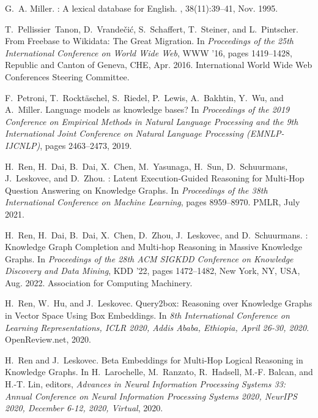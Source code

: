 \documentclass[11pt]{article}
\begin{document}
\begin{thebibliography}{10}
\begin{small}
G.~A. Miller.
: A lexical database for {{English}}.
, 38(11):39--41, Nov. 1995.

T.~Pellissier~Tanon, D.~Vrande{\v c}i{\'c}, S.~Schaffert, T.~Steiner, and
  L.~Pintscher.
\newblock From {{Freebase}} to {{Wikidata}}: {{The Great Migration}}.
\newblock In {\em Proceedings of the 25th {{International Conference}} on
  {{World Wide Web}}}, {{WWW}} '16, pages 1419--1428, {Republic and Canton of
  Geneva, CHE}, Apr. 2016. {International World Wide Web Conferences Steering
  Committee}.

F.~Petroni, T.~Rockt{\"a}schel, S.~Riedel, P.~Lewis, A.~Bakhtin, Y.~Wu, and
  A.~Miller.
\newblock Language models as knowledge bases?
\newblock In {\em Proceedings of the 2019 Conference on Empirical Methods in
  Natural Language Processing and the 9th International Joint Conference on
  Natural Language Processing (EMNLP-IJCNLP)}, pages 2463--2473, 2019.

H.~Ren, H.~Dai, B.~Dai, X.~Chen, M.~Yasunaga, H.~Sun, D.~Schuurmans,
  J.~Leskovec, and D.~Zhou.
: {{Latent Execution-Guided Reasoning}} for {{Multi-Hop
  Question Answering}} on {{Knowledge Graphs}}.
\newblock In {\em Proceedings of the 38th {{International Conference}} on
  {{Machine Learning}}}, pages 8959--8970. {PMLR}, July 2021.

H.~Ren, H.~Dai, B.~Dai, X.~Chen, D.~Zhou, J.~Leskovec, and D.~Schuurmans.
: {{Knowledge Graph Completion}} and {{Multi-hop Reasoning}}
  in {{Massive Knowledge Graphs}}.
\newblock In {\em Proceedings of the 28th {{ACM SIGKDD Conference}} on
  {{Knowledge Discovery}} and {{Data Mining}}}, {{KDD}} '22, pages 1472--1482,
  {New York, NY, USA}, Aug. 2022. {Association for Computing Machinery}.

H.~Ren, W.~Hu, and J.~Leskovec.
\newblock Query2box: {{Reasoning}} over {{Knowledge Graphs}} in {{Vector Space
  Using Box Embeddings}}.
\newblock In {\em 8th {{International Conference}} on {{Learning
  Representations}}, {{ICLR}} 2020, {{Addis Ababa}}, {{Ethiopia}}, {{April}}
  26-30, 2020}. {OpenReview.net}, 2020.

H.~Ren and J.~Leskovec.
\newblock Beta {{Embeddings}} for {{Multi-Hop Logical Reasoning}} in
  {{Knowledge Graphs}}.
\newblock In H.~Larochelle, M.~Ranzato, R.~Hadsell, M.-F. Balcan, and H.-T.
  Lin, editors, {\em Advances in {{Neural Information Processing Systems}} 33:
  {{Annual Conference}} on {{Neural Information Processing Systems}} 2020,
  {{NeurIPS}} 2020, {{December}} 6-12, 2020, Virtual}, 2020.


\end{small}
\end{thebibliography}
\end{document}
